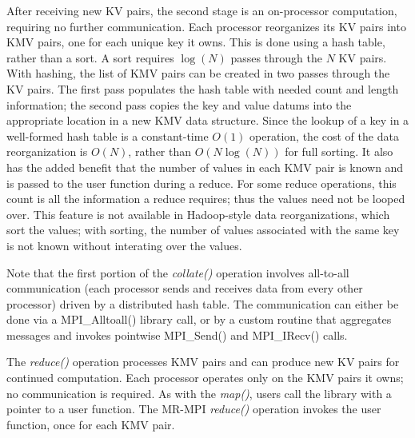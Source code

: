 After receiving new KV pairs, the second stage is an on-processor
computation, requiring no further communication.  Each processor
reorganizes its KV pairs into KMV pairs, one for each unique key it
owns.  This is done using a hash table, rather than a sort.  A sort
requires $\log(N)$ passes through the $N$ KV pairs.  With hashing,
the list of KMV
pairs can be created in two passes through the KV pairs. The first 
pass populates
the hash table with needed count and length information; the
second pass copies the key and value datums into the appropriate
location in a new KMV data structure.  Since the lookup of a key in a
well-formed hash table is a constant-time $O(1)$ operation, the cost
of the data reorganization is $O(N)$, rather than $O(N\log(N))$ for full
sorting.  It also has the added benefit that the number of values in each
KMV pair is known and is passed to the user function during a
reduce.  For some reduce operations, this count is all the information a
reduce requires; thus the values need not be looped over.  This feature is not
available in Hadoop-style data reorganizations, which sort the values; 
with sorting, the number of values associated with the same key is not known 
without interating over the values.

Note that the first portion of the {\it collate()} operation involves
all-to-all communication (each processor sends and receives data from
every other processor) driven by a distributed hash table.  The
communication can either be done via a MPI\_Alltoall() library call,
or by a custom routine that aggregates messages and invokes pointwise
MPI\_Send() and MPI\_IRecv() calls.

The {\it reduce()} operation processes KMV pairs and can produce new
KV pairs for continued computation.  Each processor operates only on
the KMV pairs it owns; no communication is required.  As with the {\it
map()}, users call the library with a pointer to a user function.  The
MR-MPI {\it reduce()} operation invokes the user function, once for
each KMV pair.

